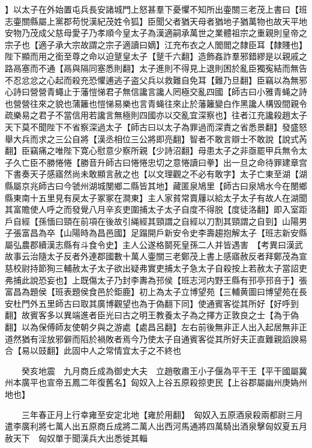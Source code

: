 】以太子在外始置屯兵長安諸城門上怒甚羣下憂懼不知所出壷關三老茂上書曰【班志壷關縣屬上黨郡苟悦漢紀茂姓令狐】臣聞父者猶天母者猶地子猶萬物也故天平地安物乃茂成父慈母愛子乃孝順今皇太子為漢適嗣承萬世之業體祖宗之重親則皇帝之宗子也【適子承大宗故謂之宗子適讀曰嫡】江充布衣之人閭閻之隸臣耳【隸賤也】陛下顯而用之銜至尊之命以迫蹵皇太子【蹵千六翻】造飾姦詐羣邪錯繆是以親戚之路鬲塞而不通【鬲與隔同塞悉則翻】太子進則不得見上退則困於亂臣獨寃結而無告不忍忿忿之心起而殺充恐懼逋逃子盗父兵以救難自免耳【難乃旦翻】臣竊以為無邪心詩曰營營青蠅止于藩愷悌君子無信讒言讒人罔極交亂四國【師古曰小雅青蝇之詩也營營往來之貌也蒲籬也愷悌易樂也言青蝇往來止於藩籬變白作黑讒人構毁間親令疏樂易之君子不當信用若讒言無極則四國亦以交亂宜深察也】往者江充讒殺趙太子天下莫不聞陛下不省察深過太子【師古曰以太子為罪過而深責之省悉景翻】發盛怒舉大兵而求之三公自將【漢丞相位三公將即亮翻】智者不敢言辯士不敢說【說式芮翻】臣竊痛之唯陛下寛心慰意少察所親【少詩沼翻】母患太子之非亟罷甲兵無令太子久亡臣不勝惓惓【勝音升師古曰惓惓忠切之意惓讀曰拳】出一旦之命待罪建章宫下書奏天子感寤然尚未敢顯言赦之也【以文理觀之不必有敢字】太子亡東至湖【湖縣屬京兆師古曰今虢州湖城閺鄉二縣皆其地】藏匿泉鳩里【師古曰泉鳩水今在閿鄉縣東南十五里見有戻太子冢冢在澗東】主人家貧常賣屨以給太子太子有故人在湖聞其富贍使人呼之而發覺八月辛亥吏圍捕太子太子自度不得脱【度徒洛翻】即入室距戶自經【孫愐曰頸在前項在後故引䋲經其頸謂之自經以刀割其頸謂之自剄】山陽男子張富昌為卒【山陽時為昌邑國】足蹋開戶新安令史李壽趨抱解太子【班志新安縣屬弘農郡續漢志縣有斗食令史】主人公遂格鬬死皇孫二人并皆遇害　【考異曰漢武故事云治隨太子反者外連郡國數十萬人壷關三老鄭茂上書上感寤赦反者拜鄭茂為宣慈校尉持節狥三輔赦太子太子欲出疑弗實吏捕太子急太子自殺按上若赦太子當詔吏弗捕此說恐妄也】上既傷太子乃封李夀為邘侯【班志河内野王縣有邘亭邘咅于】張富昌為題侯【班表題侯食邑於鉅鹿】初上為太子立博望苑【三輔黄圖曰博望苑在長安杜門外五里師古曰取其廣博觀望也為于偽翻下同】使通賓客從其所好【好呼到翻】故賓客多以異端進者臣光曰古之明王教養太子為之擇方正敦良之士【為于偽翻】以為保傅師友使朝夕與之游處【處昌呂翻】左右前後無非正人出入起居無非正道然猶有淫放邪僻而䧟於禍敗者焉今乃使太子自通賓客從其所好夫正直難親謟諛易合【易以豉翻】此固中人之常情宜太子之不終也

　　癸亥地震　九月商丘成為御史大夫　立趙敬肅王小子偃為平干王【平干國屬冀州本廣平也宣帝五鳳二年復舊名】匈奴入上谷五原殺掠吏民【上谷郡屬幽州庚媯州地也】

　　三年春正月上行幸雍至安定北地【雍於用翻】　匈奴入五原酒泉殺兩都尉三月遣李廣利將七萬人出五原商丘成將二萬人出西河馬通將四萬騎出酒泉擊匈奴夏五月赦天下　匈奴單于聞漢兵大出悉徙其輜

